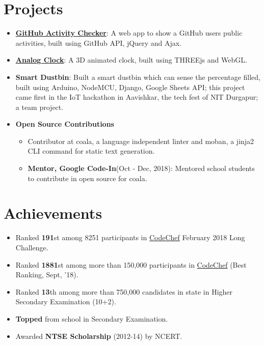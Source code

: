 \documentclass[letterpaper,11pt]{article}
\newcommand{\resumeItemListStart}{\begin{itemize}}
\newcommand{\resumeItemListEnd}{\end{itemize}\vspace{-5pt}}
\begin{document}
\section{Projects}
      \setlength{\itemsep}{0.5pt}
      \begin{itemize}
        \item\textbf{\href{https://github.com/ayan-b/GitHub-Activity-Checker}{GitHub Activity Checker}}{: A web app to show a GitHub user\textsc{}s public activities, built using GitHub API, jQuery and Ajax.}\\
        \item\textbf{\href{https://github.com/ayan-b/Analog-Clock-Reading}{Analog Clock}}{: A 3D animated clock, built using THREEjs and WebGL.}\\
        \item\textbf{Smart Dustbin}{: Built a smart dustbin which can sense the percentage filled, built using Arduino, NodeMCU, Django, Google Sheets API; this project came first in the IoT hackathon in Aavishkar, the tech
        fest of NIT Durgapur; a team project.}\\
        \item\textbf{Open Source Contributions}
        \begin{itemize}
            \item{Contributor at coala, a language independent linter and moban, a jinja2 CLI command for static text generation.}\\
            \item\textbf{Mentor, Google Code-In}{(Oct - Dec, 2018)}{: Mentored school students to contribute in open source for coala.}
         \end{itemize}   
      \end{itemize}
  
\section{Achievements}
    \resumeItemListStart
     \setlength{\itemsep}{0.5pt}
      \item
        {Ranked \textbf{191}st among 8251 participants in \href{https://www.codechef.com/rankings/FEB18?filterBy=Institution\%3DNational\%20Institute\%20of\%20Technology\%2C\%20Durgapur&order=asc&sortBy=rank}{CodeChef} February 2018 Long Challenge.}
      \item
        {Ranked \textbf{1881}st among more than 150,000 participants in \href{https://codechef.com/users/ayan_nitd}{CodeChef} (Best Ranking, Sept, '18).}
      \item
        {Ranked \textbf{13}th among more than 750,000 candidates in state in Higher Secondary Examination
        (10+2).}
      \item
        {\textbf{Topped} from school in Secondary Examination.}
      \item
        {Awarded \textbf{NTSE Scholarship} (2012-14) by NCERT.}
    \resumeItemListEnd
\end{document}
